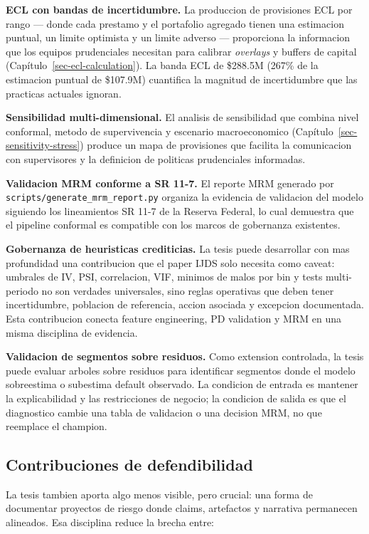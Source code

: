 \documentclass[
  spanish,
  11pt,
  letterpaper,
]{scrbook}
\theoremstyle{plain}
\theoremstyle{remark}
\begin{document}
\textbf{ECL con bandas de incertidumbre.} La produccion de provisiones
ECL por rango --- donde cada prestamo y el portafolio agregado tienen
una estimacion puntual, un limite optimista y un limite adverso ---
proporciona la informacion que los equipos prudenciales necesitan para
calibrar \emph{overlays} y buffers de capital
(Capítulo~\ref{sec-ecl-calculation}). La banda ECL de \$288.5M (267\% de
la estimacion puntual de \$107.9M) cuantifica la magnitud de
incertidumbre que las practicas actuales ignoran.

\textbf{Sensibilidad multi-dimensional.} El analisis de sensibilidad que
combina nivel conformal, metodo de supervivencia y escenario
macroeconomico (Capítulo~\ref{sec-sensitivity-stress}) produce un mapa
de provisiones que facilita la comunicacion con supervisores y la
definicion de politicas prudenciales informadas.

\textbf{Validacion MRM conforme a SR 11-7.} El reporte MRM generado por
\texttt{scripts/generate\_mrm\_report.py} organiza la evidencia de
validacion del modelo siguiendo los lineamientos SR 11-7 de la Reserva
Federal, lo cual demuestra que el pipeline conformal es compatible con
los marcos de gobernanza existentes.

\textbf{Gobernanza de heuristicas crediticias.} La tesis puede
desarrollar con mas profundidad una contribucion que el paper IJDS solo
necesita como caveat: umbrales de IV, PSI, correlacion, VIF, minimos de
malos por bin y tests multi-periodo no son verdades universales, sino
reglas operativas que deben tener incertidumbre, poblacion de
referencia, accion asociada y excepcion documentada. Esta contribucion
conecta feature engineering, PD validation y MRM en una misma disciplina
de evidencia.

\textbf{Validacion de segmentos sobre residuos.} Como extension
controlada, la tesis puede evaluar arboles sobre residuos para
identificar segmentos donde el modelo sobreestima o subestima default
observado. La condicion de entrada es mantener la explicabilidad y las
restricciones de negocio; la condicion de salida es que el diagnostico
cambie una tabla de validacion o una decision MRM, no que reemplace el
champion.

\subsection{Contribuciones de
defendibilidad}\label{contribuciones-de-defendibilidad}

La tesis tambien aporta algo menos visible, pero crucial: una forma de
documentar proyectos de riesgo donde claims, artefactos y narrativa
permanecen alineados. Esa disciplina reduce la brecha entre:
\end{document}
